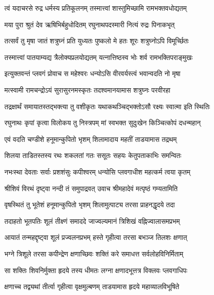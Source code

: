 \twolineshloka
{त्वं यदाचरसे रुद्र धर्मस्य प्रतिकूलनम्}
{तस्मात्त्वां शास्तुमिच्छामि रामभक्तवधोद्यतम्}%

\twolineshloka
{मया पुरा श्रुतं देव ऋषिभिर्बहुधोदितम्}
{रघुनाथपदस्मारी नित्यं रुद्रः पिनाकभृत्}%

\twolineshloka
{तत्सर्वं तु मृषा जातं शत्रुघ्नं प्रति युध्यतः}
{पुष्कलो मे हतः शूरः शत्रुघ्नोऽपि विमूर्च्छितः}%

\twolineshloka
{तस्मात्त्वां पातयाम्यद्य त्रैलोक्यप्रलयोद्यतम्}
{यत्नात्तिष्ठस्व भोः शर्व रामभक्तिपराङ्मुखः}%


\twolineshloka
{इत्युक्तवन्तं प्लवगं प्रोवाच स महेश्वरः}
{धन्योऽसि वीरवर्यस्त्वं भवान्वदति नो मृषा}%

\twolineshloka
{मत्स्वामी रामचन्द्रोऽयं सुरासुरनमस्कृतः}
{तदश्वमानयामास शत्रुघ्नः परवीरहा}%

\twolineshloka
{तद्रक्षार्थं समायातस्तद्भक्त्या तु वशीकृतः}
{यथाकथञ्चिद्भक्तोऽसौ रक्ष्यः स्वात्मा इति स्थितिः}%

\twolineshloka
{रघुनाथः कृपां कृत्वा विलोकय तु निस्त्रपम्}
{मां स्वभक्त सुदुःखेन किञ्चित्कोपं दधन्महान्}%


\twolineshloka
{एवं वदति चण्डीशे हनूमान्कुपितो भृशम्}
{शिलामादाय महतीं ताडयामास तद्रथम्}%

\twolineshloka
{शिलया ताडितस्तस्य रथः शकलतां गतः}
{ससूतः सहयः केतुपताकाभिः समन्वितः}%

\twolineshloka
{नभःस्था देवताः सर्वाः प्रशशंसुः कपीश्वरम्}
{धन्योसि प्लवगाधीश महत्कर्म त्वया कृतम्}%

\twolineshloka
{श्रीशिवं विरथं दृष्ट्वा नन्दी तं समुपाद्रवत्}
{उवाच श्रीमहादेवं मत्पृष्ठं गम्यतामिति}%

\twolineshloka
{वृषस्थितं तु भूतेशं हनूमान्कुपितो भृशम्}
{शिलामुत्पाट्य तरसा प्राहनद्धृदये तदा}%

\twolineshloka
{तदाहतो भूतपतिः शूलं तीक्ष्णं समाददे}
{जाज्वल्यमानं त्रिशिखं वह्निज्वालासमप्रभम्}%

\twolineshloka
{आयातं तन्महद्दृष्ट्वा शूलं प्रज्वलनप्रभम्}
{हस्ते गृहीत्वा तरसा बभञ्ज तिलशः क्षणात्}%

\twolineshloka
{भग्ने त्रिशूले तरसा कपीन्द्रेण क्षणाच्छिवः}
{शक्तिं करे समाधत्त सर्वलोहविनिर्मिताम्}%

\twolineshloka
{सा शक्तिः शिवनिर्मुक्ता हृदये तस्य धीमतः}
{लग्ना क्षणादभूत्तत्र विक्लवः प्लवगाधिपः}%

\twolineshloka
{क्षणाच्च तद्व्यथां तीर्त्वा गृहीत्वा वृक्षमुल्बणम्}
{ताडयामास हृदये महाव्यालविभूषिते}%

